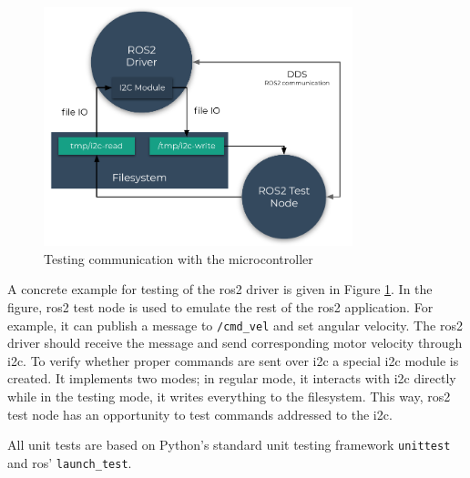 \begin{figure}[H]
    \centering
    \includegraphics[width=0.8\textwidth]{physical/figures/mocking.pdf}
    \caption{Testing communication with the microcontroller}
    \label{fig:physical:mocking}
\end{figure}

A concrete example for testing of the \ac{ros2} driver is given in Figure \ref{fig:physical:mocking}.
In the figure, \ac{ros2} test node is used to emulate the rest of the \ac{ros2} application.
For example, it can publish a message to \texttt{/cmd\_vel} and set angular velocity.
The \ac{ros2} driver should receive the message and send corresponding motor velocity through \ac{i2c}.
To verify whether proper commands are sent over \ac{i2c} a special \ac{i2c} module is created.
It implements two modes; in regular mode, it interacts with \ac{i2c} directly while in the testing mode, it writes everything to the filesystem. 
This way, \ac{ros2} test node has an opportunity to test commands addressed to the \ac{i2c}.

All unit tests are based on Python's standard unit testing framework \texttt{unittest} and \ac{ros}' \texttt{launch\_test}.

